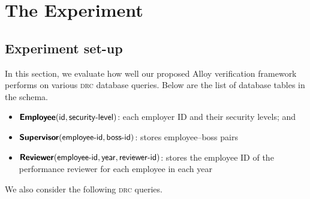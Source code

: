 \section{The Experiment}
\label{sec:experiment}

\subsection{Experiment set-up}

In this section, we evaluate how well our proposed Alloy verification framework performs on various \textsc{drc} database queries. Below are the list of database tables in the schema.

\newrobustcmd{}
\newrobustcmd{}
\newrobustcmd{}

\begin{itemize}[topsep=0.5pc,itemsep=0.25pc]
    \item  $\Employee(\field{id}, \field{security-level})$:\; each employer ID and their security levels; and
    \item  $\Supervisor(\field{employee-id},\field{boss-id})$:\; stores employee--boss pairs
    \item  $\Reviewer(\field{employee-id},\field{year},\field{reviewer-id})$:\; stores the employee ID of the performance reviewer for each employee in each year
\end{itemize}

\newrobustcmd{\level}{\ensuremath{\ell}}

\medskip\noindent
We also consider the following \textsc{drc} queries.

